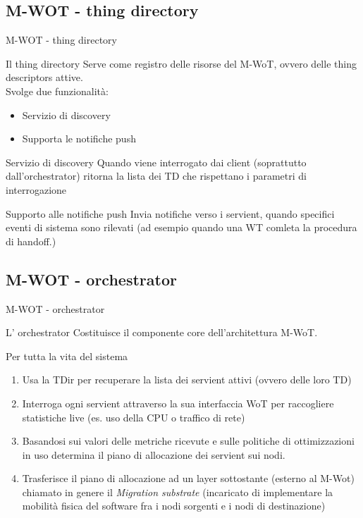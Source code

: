 \documentclass{beamer}
\begin{document}
\subsection{M-WOT - thing directory}
\begin{frame}{M-WOT - thing directory}
	\begin{block}{Il thing directory }
		Serve come registro delle risorse del M-WoT, ovvero delle thing descriptors attive.\\
		Svolge due funzionalità:
		\begin{itemize}
			\item Servizio di discovery
			\item Supporta le notifiche push
		\end{itemize}
	\end{block}
	\begin{block}{Servizio di discovery}
		Quando viene interrogato dai client (soprattutto dall'orchestrator) ritorna la lista dei TD che rispettano i parametri di interrogazione
	\end{block}
	\begin{block}{Supporto alle notifiche push}
		Invia notifiche verso i servient, quando specifici eventi di sistema sono rilevati (ad esempio quando una WT comleta la procedura di handoff.)
	\end{block}
\end{frame}

\subsection{M-WOT - orchestrator}
\begin{frame}{M-WOT - orchestrator}
	\begin{block}{L' orchestrator}
		Costituisce il componente core dell'architettura M-WoT.
	\end{block}
	\begin{block}{Per tutta la vita del sistema}
		\begin{enumerate}
			\item Usa la TDir per recuperare la lista dei servient attivi (ovvero delle loro TD)
			\item Interroga ogni servient attraverso la sua interfaccia WoT per raccogliere statistiche live (es. uso della CPU o traffico di rete)
			\item Basandosi sui valori delle metriche ricevute e sulle politiche di ottimizzazioni in uso determina il piano di allocazione dei servient sui nodi.
			\item Trasferisce il piano di allocazione ad un layer sottostante (esterno al M-Wot) chiamato in genere  il \textit{Migration substrate} (incaricato di implementare la mobilità fisica del software fra i nodi sorgenti e i nodi di destinazione)
		\end{enumerate}
	\end{block}
\end{frame}
\end{document}
